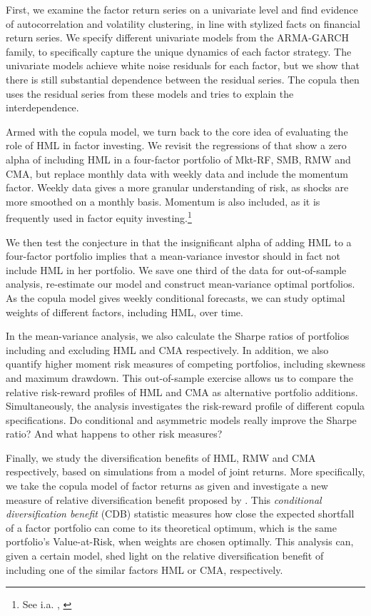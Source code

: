 First, we examine the factor return series on a univariate level and find evidence of autocorrelation and volatility clustering, in line with stylized facts on financial return series. We specify different univariate models from the ARMA-GARCH family, to specifically capture the unique dynamics of each factor strategy. The univariate models achieve white noise residuals for each factor, but we show that there is still substantial dependence between the residual series. The copula then uses the residual series from these models and tries to explain the interdependence.

Armed with the copula model, we turn back to the core idea of evaluating the role of HML in factor investing. We revisit the regressions of \textcite{FF2015} that show a zero alpha of including HML in a four-factor portfolio of Mkt-RF, SMB, RMW and CMA, but replace monthly data with weekly data and include the momentum factor. Weekly data gives a more granular understanding of risk, as shocks are more smoothed on a monthly basis. Momentum is also included, as it is frequently used in factor equity investing.\footnote{See i.a. \textcite{Pedersen2015}, \textcite{Ilmanen2011}} 

We then test the conjecture in \textcite{FF2015} that the insignificant alpha of adding HML to a four-factor portfolio implies that a mean-variance investor should in fact not include HML in her portfolio. We save one third of the data for out-of-sample analysis, re-estimate our model and construct mean-variance optimal portfolios. As the copula model gives weekly conditional forecasts, we can study optimal weights of different factors, including HML, over time.

In the mean-variance analysis, we also calculate the Sharpe ratios of portfolios including and excluding HML and CMA respectively. In addition, we also quantify higher moment risk measures of competing portfolios, including skewness and maximum drawdown. This out-of-sample exercise allows us to compare the relative risk-reward profiles of HML and CMA as alternative portfolio additions. Simultaneously, the analysis investigates the risk-reward profile of different copula specifications. Do conditional and asymmetric models really improve the Sharpe ratio? And what happens to other risk measures?

Finally, we study the diversification benefits of HML, RMW and CMA respectively, based on simulations from a model of joint returns. More specifically, we take the copula model of factor returns as given and investigate a new measure of relative diversification benefit proposed by \textcite{ChristoffersenErrunzaJacobLanglois2012}. This \emph{conditional diversification benefit} (CDB) statistic measures how close the expected shortfall of a factor portfolio can come to its theoretical optimum, which is the same portfolio's Value-at-Risk, when weights are chosen optimally. This analysis can, given a certain model, shed light on the relative diversification benefit of including one of the similar factors HML or CMA, respectively.

